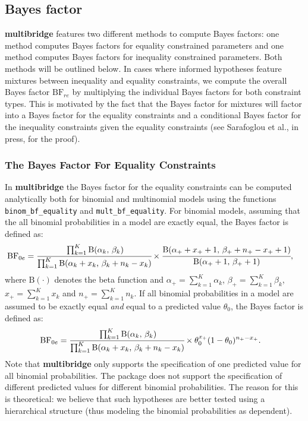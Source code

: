 \documentclass[
  english,
  man,floatsintext]{apa6}
\begin{document}
\hypertarget{bayes-factor}{%
\subsection{Bayes factor}\label{bayes-factor}}

\noindent \textbf{multibridge} features two different methods to compute Bayes factors: one method computes Bayes factors for equality constrained parameters and one method computes Bayes factors for inequality constrained parameters. Both methods will be outlined below. In cases where informed hypotheses feature mixtures between inequality and equality constraints, we compute the overall Bayes factor \(\text{BF}_{re}\) by multiplying the individual Bayes factors for both constraint types. This is motivated by the fact that the Bayes factor for mixtures will factor into a Bayes factor for the equality constraints and a conditional Bayes factor for the inequality constraints given the equality constraints (see Sarafoglou et al., in press, for the proof).

\hypertarget{the-bayes-factor-for-equality-constraints}{%
\subsubsection{The Bayes Factor For Equality Constraints}\label{the-bayes-factor-for-equality-constraints}}

\noindent In \textbf{multibridge} the Bayes factor for the equality constraints can be computed analytically both for binomial and multinomial models using the functions \texttt{binom\_bf\_equality} and \texttt{mult\_bf\_equality}. For binomial models, assuming that the all binomial probabilities in a model are exactly equal, the Bayes factor is defined as:
\begin{align*}
\text{BF}_{0e}
&= \cfrac{\prod_{k=1}^K \text{B}(\alpha_k \text{, } \beta_k)}{\prod_{k=1}^K \text{B}(\alpha_k + x_k\text{, } \beta_k + n_k - x_k)} \times \cfrac{\text{B}(\alpha_+ + x_+ + 1\text{, } \beta_+ + n_+ - x_+ + 1)}{\text{B}(\alpha_+ + 1\text{, }\beta_+ + 1)},
\end{align*}
where \(\text{B}(\cdot)\) denotes the beta function and \(\alpha_+ = \sum_{k=1}^K\alpha_k\), \(\beta_+ = \sum_{k=1}^K\beta_k\), \(x_+ = \sum_{k=1}^K x_k\) and \(n_+ = \sum_{k=1}^K n_k\). If all binomial probabilities in a model are assumed to be exactly equal \textit{and} equal to a predicted value \(\theta_{0}\), the Bayes factor is defined as:
\begin{align*}
\text{BF}_{0e}
&= \cfrac{\prod_{k=1}^K \text{B}(\alpha_k \text{, } \beta_k)}{\prod_{k=1}^K \text{B}(\alpha_k + x_k\text{, } \beta_k + n_k - x_k)} \times \theta_{0}^{x_+} (1 - \theta_{0})^{n_+ - x_+}.
\end{align*}
Note that \textbf{multibridge} only supports the specification of one predicted value for all binomial probabilities. The package does not support the specification of different predicted values for different binomial probabilities. The reason for this is theoretical: we believe that such hypotheses are better tested using a hierarchical structure (thus modeling the binomial probabilities as dependent).
\end{document}
